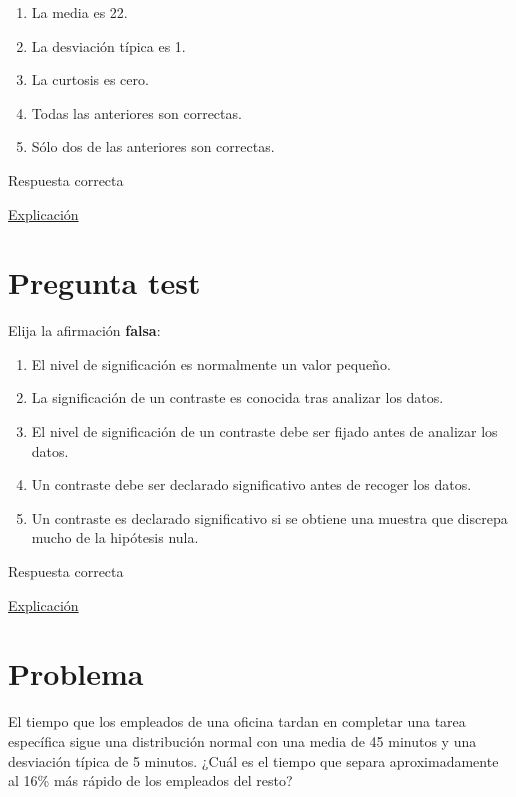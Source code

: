 \documentclass[
]{book}
\providecommand{\tightlist}{%
  \setlength{\itemsep}{0pt}\setlength{\parskip}{0pt}}
\begin{document}
\begin{enumerate}
\def\labelenumi{\alph{enumi})}
\tightlist
\item
  La media es 22.
\item
  La desviación típica es 1.
\item
  La curtosis es cero.
\item
  Todas las anteriores son correctas.
\item
  Sólo dos de las anteriores son correctas.
\end{enumerate}

Respuesta correcta

\href{https://1fjmanzano.github.io/bioestadistica/distribuciones-de-probabilidad.html\#distribucio\%CC\%81n-normal}{Explicación}

\hypertarget{pregunta-test-113}{%
\section{Pregunta test}\label{pregunta-test-113}}

Elija la afirmación \textbf{falsa}:

\begin{enumerate}
\def\labelenumi{\alph{enumi})}
\tightlist
\item
  El nivel de significación es normalmente un valor pequeño.
\item
  La significación de un contraste es conocida tras analizar los datos.
\item
  El nivel de significación de un contraste debe ser fijado antes de analizar los datos.
\item
  Un contraste debe ser declarado significativo antes de recoger los datos.
\item
  Un contraste es declarado significativo si se obtiene una muestra que discrepa mucho de la hipótesis nula.
\end{enumerate}

Respuesta correcta

\href{https://1fjmanzano.github.io/bioestadistica/contrastes-de-hipo\%CC\%81tesis.html}{Explicación}

\hypertarget{problema-11}{%
\section{Problema}\label{problema-11}}

El tiempo que los empleados de una oficina tardan en completar una tarea específica sigue una distribución normal con una media de 45 minutos y una desviación típica de 5 minutos. ¿Cuál es el tiempo que separa aproximadamente al 16\% más rápido de los empleados del resto?
\end{document}
